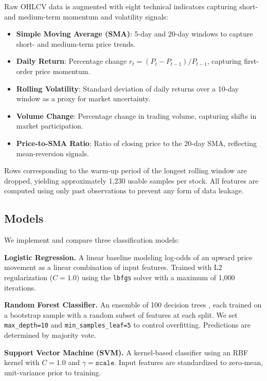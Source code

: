 \documentclass{article}
\begin{document}
Raw OHLCV data is augmented with eight technical indicators capturing short- and
medium-term momentum and volatility signals:

\begin{itemize}
    \item \textbf{Simple Moving Average (SMA)}: 5-day and 20-day windows to
    capture short- and medium-term price trends.
    \item \textbf{Daily Return}: Percentage change $r_t = (P_t - P_{t-1}) /
    P_{t-1}$, capturing first-order price momentum.
    \item \textbf{Rolling Volatility}: Standard deviation of daily returns over
    a 10-day window as a proxy for market uncertainty.
    \item \textbf{Volume Change}: Percentage change in trading volume, capturing
    shifts in market participation.
    \item \textbf{Price-to-SMA Ratio}: Ratio of closing price to the 20-day SMA,
    reflecting mean-reversion signals.
\end{itemize}

Rows corresponding to the warm-up period of the longest rolling window are
dropped, yielding approximately 1,230 usable samples per stock. All features
are computed using only past observations to prevent any form of data leakage.

\subsection{Models}

We implement and compare three classification models:

\textbf{Logistic Regression.} A linear baseline modeling log-odds of an upward
price movement as a linear combination of input features. Trained with L2
regularization ($C = 1.0$) using the \texttt{lbfgs} solver with a maximum of
1,000 iterations.

\textbf{Random Forest Classifier.} An ensemble of 100 decision trees
\citep{breiman2001}, each trained on a bootstrap sample with a random subset of
features at each split. We set \texttt{max\_depth=10} and
\texttt{min\_samples\_leaf=5} to control overfitting. Predictions are determined
by majority vote.

\textbf{Support Vector Machine (SVM).} A kernel-based classifier
\citep{cortes1995} using an RBF kernel with $C = 1.0$ and $\gamma =
\texttt{scale}$. Input features are standardized to zero-mean, unit-variance
prior to training.
\end{document}
